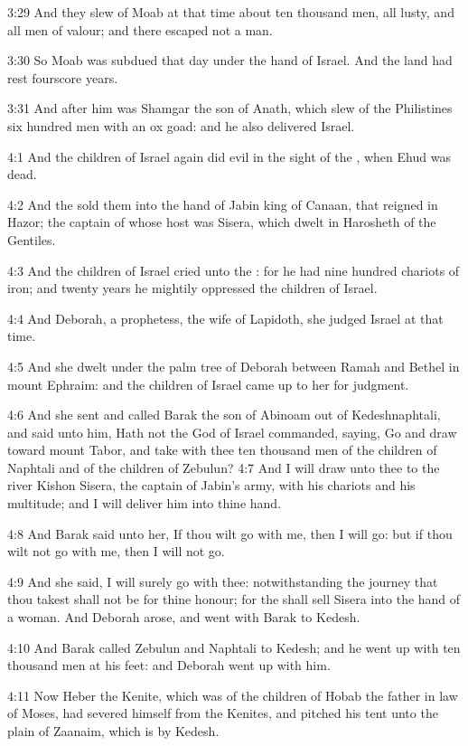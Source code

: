 3:29 And they slew of Moab at that time about ten thousand men, all lusty, and all men of valour; and there escaped not a man.

3:30 So Moab was subdued that day under the hand of Israel. And the land had rest fourscore years.

3:31 And after him was Shamgar the son of Anath, which slew of the Philistines six hundred men with an ox goad: and he also delivered Israel.

4:1 And the children of Israel again did evil in the sight of the \LORD, when Ehud was dead.

4:2 And the \LORD sold them into the hand of Jabin king of Canaan, that reigned in Hazor; the captain of whose host was Sisera, which dwelt in Harosheth of the Gentiles.

4:3 And the children of Israel cried unto the \LORD: for he had nine hundred chariots of iron; and twenty years he mightily oppressed the children of Israel.

4:4 And Deborah, a prophetess, the wife of Lapidoth, she judged Israel at that time.

4:5 And she dwelt under the palm tree of Deborah between Ramah and Bethel in mount Ephraim: and the children of Israel came up to her for judgment.

4:6 And she sent and called Barak the son of Abinoam out of Kedeshnaphtali, and said unto him, Hath not the \LORD God of Israel commanded, saying, Go and draw toward mount Tabor, and take with thee ten thousand men of the children of Naphtali and of the children of Zebulun?  4:7 And I will draw unto thee to the river Kishon Sisera, the captain of Jabin's army, with his chariots and his multitude; and I will deliver him into thine hand.

4:8 And Barak said unto her, If thou wilt go with me, then I will go: but if thou wilt not go with me, then I will not go.

4:9 And she said, I will surely go with thee: notwithstanding the journey that thou takest shall not be for thine honour; for the \LORD shall sell Sisera into the hand of a woman. And Deborah arose, and went with Barak to Kedesh.

4:10 And Barak called Zebulun and Naphtali to Kedesh; and he went up with ten thousand men at his feet: and Deborah went up with him.

4:11 Now Heber the Kenite, which was of the children of Hobab the father in law of Moses, had severed himself from the Kenites, and pitched his tent unto the plain of Zaanaim, which is by Kedesh.

